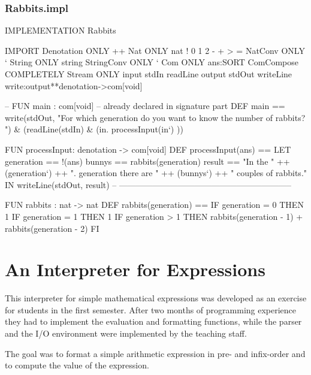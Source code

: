 \subsubsection{Rabbits.impl}
\begin{prog}
IMPLEMENTATION Rabbits

IMPORT  Denotation      ONLY  ++
        Nat             ONLY nat ! 0 1 2 - + > = 
        NatConv         ONLY `
        String          ONLY string 
        StringConv      ONLY `
        Com             ONLY ans:SORT
        ComCompose      COMPLETELY
        Stream          ONLY input stdIn readLine 
                             output stdOut writeLine
                             write:output**denotation->com[void]

-- FUN main : com[void] -- already declared in signature part
DEF main == 
    write(stdOut, 
 "For which generation do you want to know the number of rabbits? ") &
    (readLine(stdIn)    & (\LAMBDA in.
     processInput(in`)
    ))

FUN processInput: denotation -> com[void]
DEF processInput(ans) == 
          LET generation == !(ans)
              bunnys     == rabbits(generation)
              result     == "In the " 
                            ++ (generation`)
                            ++ ". generation there are " 
                            ++ (bunnys`) 
                            ++ " couples of rabbits." 
          IN writeLine(stdOut, result)
-- --------------------------------------------------------------

FUN rabbits : nat -> nat
DEF rabbits(generation) ==
        IF generation = 0 THEN 1
        IF generation = 1 THEN 1
        IF generation > 1 THEN rabbits(generation - 1) 
                               + rabbits(generation - 2)
        FI
\end{prog}

\section{An Interpreter for Expressions}
\label{app:expressions}

This interpreter for simple mathematical expressions was developed as
an exercise for students in the first semester.
 After two months of programming experience they had to
implement the evaluation and formatting functions, while the parser
and the I/O environment were implemented by the teaching staff.

The goal was to format a simple arithmetic expression in pre- and
infix-order and to compute the value of the expression. 

